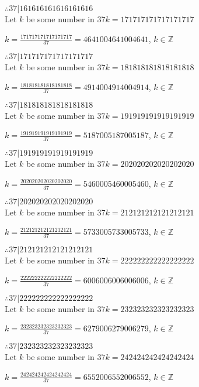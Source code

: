 \documentclass{article}
\begin{document}
$ \therefore  37|161616161616161616 $ \\

Let $k$ be some number in $37k = 171717171717171717$

$k = \frac{171717171717171717}{37} = 4641004641004641$, $k \in \mathbb{Z}$

$ \therefore  37|171717171717171717 $ \\

Let $k$ be some number in $37k = 181818181818181818$

$k = \frac{181818181818181818}{37} = 4914004914004914$, $k \in \mathbb{Z}$

$ \therefore  37|181818181818181818 $ \\

Let $k$ be some number in $37k = 191919191919191919$

$k = \frac{191919191919191919}{37} = 5187005187005187$, $k \in \mathbb{Z}$

$ \therefore  37|191919191919191919 $ \\

Let $k$ be some number in $37k = 202020202020202020$

$k = \frac{202020202020202020}{37} = 5460005460005460$, $k \in \mathbb{Z}$

$ \therefore  37|202020202020202020 $ \\

Let $k$ be some number in $37k = 212121212121212121$

$k = \frac{212121212121212121}{37} = 5733005733005733$, $k \in \mathbb{Z}$

$ \therefore  37|212121212121212121 $ \\

Let $k$ be some number in $37k = 222222222222222222$

$k = \frac{222222222222222222}{37} = 6006006006006006$, $k \in \mathbb{Z}$

$ \therefore  37|222222222222222222 $ \\

Let $k$ be some number in $37k = 232323232323232323$

$k = \frac{232323232323232323}{37} = 6279006279006279$, $k \in \mathbb{Z}$

$ \therefore  37|232323232323232323 $ \\

Let $k$ be some number in $37k = 242424242424242424$

$k = \frac{242424242424242424}{37} = 6552006552006552$, $k \in \mathbb{Z}$
\end{document}
